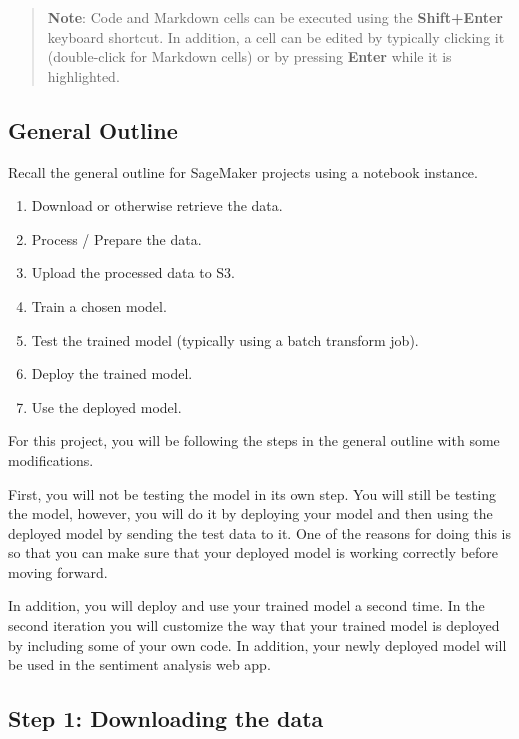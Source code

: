 \documentclass[11pt]{article}
\providecommand{\tightlist}{%
      \setlength{\itemsep}{0pt}\setlength{\parskip}{0pt}}
\begin{document}
\begin{quote}
\textbf{Note}: Code and Markdown cells can be executed using the
\textbf{Shift+Enter} keyboard shortcut. In addition, a cell can be
edited by typically clicking it (double-click for Markdown cells) or by
pressing \textbf{Enter} while it is highlighted.
\end{quote}

\hypertarget{general-outline}{%
\subsection{General Outline}\label{general-outline}}

Recall the general outline for SageMaker projects using a notebook
instance.

\begin{enumerate}
\def\labelenumi{\arabic{enumi}.}
\tightlist
\item
  Download or otherwise retrieve the data.
\item
  Process / Prepare the data.
\item
  Upload the processed data to S3.
\item
  Train a chosen model.
\item
  Test the trained model (typically using a batch transform job).
\item
  Deploy the trained model.
\item
  Use the deployed model.
\end{enumerate}

For this project, you will be following the steps in the general outline
with some modifications.

First, you will not be testing the model in its own step. You will still
be testing the model, however, you will do it by deploying your model
and then using the deployed model by sending the test data to it. One of
the reasons for doing this is so that you can make sure that your
deployed model is working correctly before moving forward.

In addition, you will deploy and use your trained model a second time.
In the second iteration you will customize the way that your trained
model is deployed by including some of your own code. In addition, your
newly deployed model will be used in the sentiment analysis web app.

    \hypertarget{step-1-downloading-the-data}{%
\subsection{Step 1: Downloading the
data}\label{step-1-downloading-the-data}}
\end{document}

